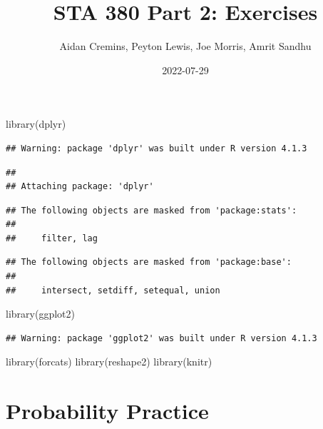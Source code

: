 \documentclass[
]{article}
\title{STA 380 Part 2: Exercises}
\author{Aidan Cremins, Peyton Lewis, Joe Morris, Amrit Sandhu}
\date{2022-07-29}
\newenvironment{Shaded}{\begin{snugshade}}{\end{snugshade}}
\newcommand{\FunctionTok}[1]{\textcolor[rgb]{0.00,0.00,0.00}{#1}}
\newcommand{\NormalTok}[1]{#1}
\begin{document}
\maketitle

\begin{Shaded}
\begin{Highlighting}[]
\FunctionTok{library}\NormalTok{(dplyr)}
\end{Highlighting}
\end{Shaded}

\begin{verbatim}
## Warning: package 'dplyr' was built under R version 4.1.3
\end{verbatim}

\begin{verbatim}
## 
## Attaching package: 'dplyr'
\end{verbatim}

\begin{verbatim}
## The following objects are masked from 'package:stats':
## 
##     filter, lag
\end{verbatim}

\begin{verbatim}
## The following objects are masked from 'package:base':
## 
##     intersect, setdiff, setequal, union
\end{verbatim}

\begin{Shaded}
\begin{Highlighting}[]
\FunctionTok{library}\NormalTok{(ggplot2)}
\end{Highlighting}
\end{Shaded}

\begin{verbatim}
## Warning: package 'ggplot2' was built under R version 4.1.3
\end{verbatim}

\begin{Shaded}
\begin{Highlighting}[]
\FunctionTok{library}\NormalTok{(forcats)}
\FunctionTok{library}\NormalTok{(reshape2)}
\FunctionTok{library}\NormalTok{(knitr)}
\end{Highlighting}
\end{Shaded}

\hypertarget{probability-practice}{%
\section{Probability Practice}\label{probability-practice}}
\end{document}
